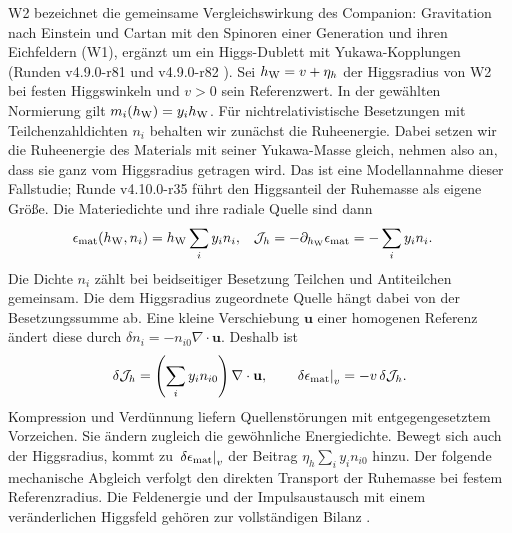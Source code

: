 W2 bezeichnet die gemeinsame Vergleichswirkung des Companion: Gravitation nach Einstein und Cartan mit den Spinoren einer Generation und ihren Eichfeldern (W1), ergänzt um ein Higgs-Dublett mit Yukawa-Kopplungen (Runden v4.9.0-r81 und v4.9.0-r82 \cite{companion}). Sei \(h_{\rm W}=v+\eta_h\) der Higgsradius von W2 bei festen Higgswinkeln und \(v>0\) sein Referenzwert. In der gewählten Normierung gilt \(m_i(h_{\rm W})=y_i h_{\rm W}\). Für nichtrelativistische Besetzungen mit Teilchenzahldichten \(n_i\) behalten wir zunächst die Ruheenergie. Dabei setzen wir die Ruheenergie des Materials mit seiner Yukawa-Masse gleich, nehmen also an, dass sie ganz vom Higgsradius getragen wird. Das ist eine Modellannahme dieser Fallstudie; Runde v4.10.0-r35 \cite{layers} führt den Higgsanteil der Ruhemasse als eigene Größe. Die Materiedichte und ihre radiale Quelle sind dann
\begin{align}
 \epsilon_{\rm mat}(h_{\rm W},n_i)&=h_{\rm W}\sum_i y_i n_i,
 &
 \mathcal J_h&=-\partial_{h_{\rm W}}\epsilon_{\rm mat}
              =-\sum_i y_i n_i .
 \label{eq:op5-yukawa}
\end{align}
Die Dichte \(n_i\) zählt bei beidseitiger Besetzung Teilchen und Antiteilchen gemeinsam. Die dem Higgsradius zugeordnete Quelle hängt dabei von der Besetzungssumme ab. Eine kleine Verschiebung \(\mathbf u\) einer homogenen Referenz ändert diese durch \(\delta n_i=-n_{i0}\nabla\cdot\mathbf u\). Deshalb ist
\begin{equation}
 \delta\mathcal J_h=\left(\sum_i y_i n_{i0}\right)\nabla\cdot\mathbf u,
 \qquad
 \left.\delta\epsilon_{\rm mat}\right|_v=-v\,\delta\mathcal J_h .
 \label{eq:op5-density}
\end{equation}
Kompression und Verdünnung liefern Quellenstörungen mit entgegengesetztem Vorzeichen. Sie ändern zugleich die gewöhnliche Energiedichte. Bewegt sich auch der Higgsradius, kommt zu \(\left.\delta\epsilon_{\rm mat}\right|_v\) der Beitrag \(\eta_h\sum_i y_i n_{i0}\) hinzu. Der folgende mechanische Abgleich verfolgt den direkten Transport der Ruhemasse bei festem Referenzradius. Die Feldenergie und der Impulsaustausch mit einem veränderlichen Higgsfeld gehören zur vollständigen Bilanz \cite{op5-density}.

